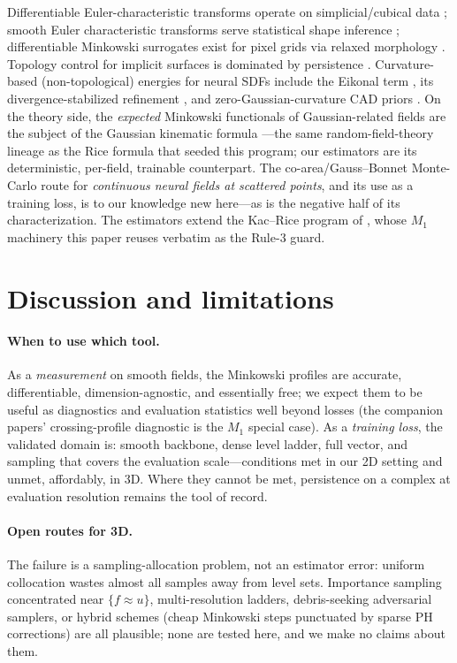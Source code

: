 \documentclass[10pt]{article}
\begin{document}
Differentiable Euler-characteristic transforms operate on simplicial/cubical data
\citep{roell2024dect}; smooth Euler characteristic transforms serve statistical shape
inference \citep{marsh2022sect}; differentiable Minkowski surrogates exist for pixel
grids via relaxed morphology \citep{minkloss2026}. Topology control for implicit
surfaces is dominated by persistence \citep{stitch2024,dong2022topologycad}.
Curvature-based (non-topological) energies for neural SDFs include the Eikonal term
\citep{gropp2020igr}, its divergence-stabilized refinement \citep{yang2023steik}, and
zero-Gaussian-curvature CAD priors \citep{neurcadrecon2024}. On the theory side, the
\emph{expected} Minkowski functionals of Gaussian-related fields are the subject of
the Gaussian kinematic formula \citep{adler2007random,azais2009level}---the same
random-field-theory lineage as the Rice formula that seeded this program; our
estimators are its deterministic, per-field, trainable counterpart. The
co-area/Gauss--Bonnet Monte-Carlo route for \emph{continuous neural fields at
scattered points}, and its use as a training loss, is to our knowledge new here---as
is the negative half of its characterization. The estimators extend the Kac--Rice
program of \citep{howe2026levelcrossing,howe2026budget}, whose $M_1$ machinery this
paper reuses verbatim as the Rule-3 guard.

\section{Discussion and limitations}
\label{sec:discussion}

\paragraph{When to use which tool.} As a \emph{measurement} on smooth fields, the
Minkowski profiles are accurate, differentiable, dimension-agnostic, and essentially
free; we expect them to be useful as diagnostics and evaluation statistics well beyond
losses (the companion papers' crossing-profile diagnostic is the $M_1$ special case).
As a \emph{training loss}, the validated domain is: smooth backbone, dense level
ladder, full vector, and sampling that covers the evaluation scale---conditions met in
our 2D setting and unmet, affordably, in 3D. Where they cannot be met, persistence on
a complex at evaluation resolution remains the tool of record.

\paragraph{Open routes for 3D.} The failure is a sampling-allocation problem, not an
estimator error: uniform collocation wastes almost all samples away from level sets.
Importance sampling concentrated near $\{f\approx u\}$, multi-resolution ladders,
debris-seeking adversarial samplers, or hybrid schemes (cheap Minkowski steps
punctuated by sparse PH corrections) are all plausible; none are tested here, and we
make no claims about them.
\end{document}
